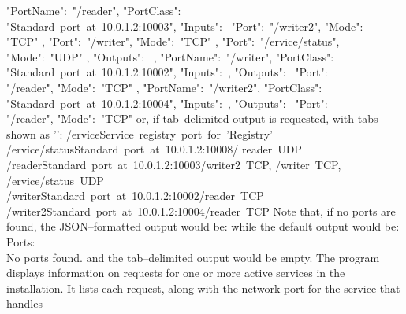 \textbraceleft{} "PortName":\ "/reader", "PortClass":\ \\
"Standard~port~at~10.0.1.2:10003", "Inputs":\ \openSq{} \textbraceleft{} "Port":\
"/writer2", "Mode":\ \\
"TCP" \textbraceright{}, \textbraceleft{} "Port":\ "/writer", "Mode":\ "TCP"
\textbraceright, \textbraceleft{} "Port":\ "/\textdollar{}ervice/status",\\
"Mode":\ "UDP" \textbraceright{} \closeSq, "Outputs":\ \sqPair{} \textbraceright,
\textbraceleft{} "PortName":\ "/writer", "PortClass":\ \\
"Standard~port~at~10.0.1.2:10002", "Inputs":\ \sqPair, "Outputs":\ \openSq{}
\textbraceleft{} "Port":\ \\
"/reader", "Mode":\ "TCP" \textbraceright{} \closeSq{} \textbraceright{},
\textbraceleft{} "PortName":\ "/writer2", "PortClass":\ \\
"Standard~port~at~10.0.1.2:10004", "Inputs":\ \sqPair, "Outputs":\ \openSq{}
\textbraceleft{} "Port":\ \\
"/reader", "Mode":\ "TCP" \textbraceright{} \closeSq{} \textbraceright{} \closeSq
\outputEnd{}
or, if tab--delimited output is requested, with tabs shown as
'\texttt{\boldmath{$\vdash$}}':
\outputBegin{}
/\textdollar{}ervice\pseudotab{}Service~registry~port~for~'Registry'\\		
/\textdollar{}ervice/status\pseudotab{}Standard~port~at~10.0.1.2:10008\pseudotab/%
reader~UDP\\
/reader\pseudotab{}Standard~port~at~10.0.1.2:10003\pseudotab/writer2~TCP,
/writer~TCP,\\
\hspace*{2em}/\textdollar{}ervice/status~UDP\\
/writer\pseudotab{}Standard~port~at~10.0.1.2:10002\pseudotab/reader~TCP\\
/writer2\pseudotab{}Standard~port~at~10.0.1.2:10004\pseudotab/reader~TCP
\outputEnd{}
Note that, if no ports are found, the JSON--formatted output would be:
\outputBegin{}
\sqPair
\outputEnd{}
while the default output would be:
\outputBegin{}
Ports:\\
\settowidth{\utilLen}{Por}%
\hspace*{\utilLen}No ports found.
\outputEnd{}
and the tab--delimited output would be empty.
The program  displays information on requests for one or more
active services in the \mplusm{} installation.
It lists each request, along with the \yarp{} network port for the service that handles
